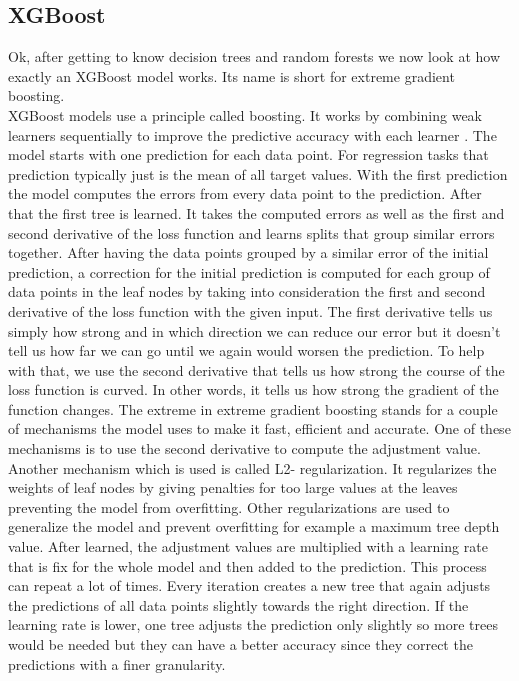 \documentclass[a4paper,12pt]{report}
\begin{document}
	\subsection{XGBoost}
	
	Ok, after getting to know decision trees and random forests we now look at how exactly an XGBoost model works. Its name is short for extreme gradient boosting. \\
	XGBoost models use a principle called boosting. It works by combining weak learners sequentially to improve the predictive accuracy with each learner \cite{55}. The model starts with one prediction for each data point. For regression tasks that prediction typically just is the mean of all target values. With the first prediction the model computes the errors from every data point to the prediction. After that the first tree is learned. It takes the computed errors as well as the first and second derivative of the loss function and learns splits that group similar errors together. After having the data points grouped by a similar error of the initial prediction, a correction for the initial prediction is computed for each group of data points in the leaf nodes by taking into consideration the first and second derivative of the loss function with the given input. The first derivative tells us simply how strong and in which direction we can reduce our error but it doesn’t tell us how far we can go until we again would worsen the prediction. To help with that, we use the second derivative that tells us how strong the course of the loss function is curved. In other words, it tells us how strong the gradient of the function changes. The extreme in extreme gradient boosting stands for a couple of mechanisms the model uses to make it fast, efficient and accurate. One of these mechanisms is to use the second derivative to compute the adjustment value. Another mechanism which is used is called L2- regularization. It regularizes the weights of leaf nodes by giving penalties for too large values at the leaves preventing the model from overfitting. Other regularizations are used to generalize the model and prevent overfitting for example a maximum tree depth value. After learned, the adjustment values are multiplied with a learning rate that is fix for the whole model and then added to the prediction. This process can repeat a lot of times. Every iteration creates a new tree that again adjusts the predictions of all data points slightly towards the right direction. If the learning rate is lower, one tree adjusts the prediction only slightly so more trees would be needed but they can have a better accuracy since they correct the predictions with a finer granularity. 
	
\end{document}
